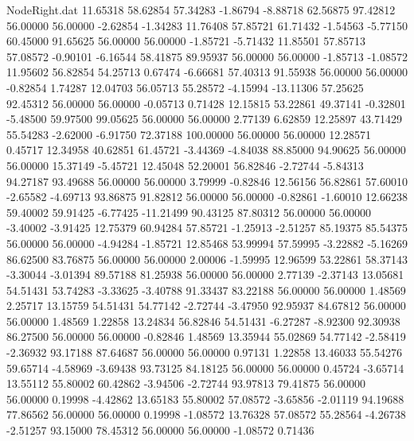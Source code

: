 \begin{filecontents}{NodeRight.dat}
  11.65318   58.62854   57.34283    -1.86794   -8.88718   62.56875   97.42812   56.00000   56.00000   -2.62854   -1.34283
  11.76408   57.85721   61.71432    -1.54563   -5.77150   60.45000   91.65625   56.00000   56.00000   -1.85721   -5.71432
  11.85501   57.85713   57.08572    -0.90101   -6.16544   58.41875   89.95937   56.00000   56.00000   -1.85713   -1.08572
  11.95602   56.82854   54.25713     0.67474   -6.66681   57.40313   91.55938   56.00000   56.00000   -0.82854    1.74287
  12.04703   56.05713   55.28572    -4.15994  -13.11306   57.25625   92.45312   56.00000   56.00000   -0.05713    0.71428
  12.15815   53.22861   49.37141    -0.32801   -5.48500   59.97500   99.05625   56.00000   56.00000    2.77139    6.62859
  12.25897   43.71429   55.54283    -2.62000   -6.91750   72.37188  100.00000   56.00000   56.00000   12.28571    0.45717
  12.34958   40.62851   61.45721    -3.44369   -4.84038   88.85000   94.90625   56.00000   56.00000   15.37149   -5.45721
  12.45048   52.20001   56.82846    -2.72744   -5.84313   94.27187   93.49688   56.00000   56.00000    3.79999   -0.82846
  12.56156   56.82861   57.60010    -2.65582   -4.69713   93.86875   91.82812   56.00000   56.00000   -0.82861   -1.60010
  12.66238   59.40002   59.91425    -6.77425  -11.21499   90.43125   87.80312   56.00000   56.00000   -3.40002   -3.91425
  12.75379   60.94284   57.85721    -1.25913   -2.51257   85.19375   85.54375   56.00000   56.00000   -4.94284   -1.85721
  12.85468   53.99994   57.59995    -3.22882   -5.16269   86.62500   83.76875   56.00000   56.00000    2.00006   -1.59995
  12.96599   53.22861   58.37143    -3.30044   -3.01394   89.57188   81.25938   56.00000   56.00000    2.77139   -2.37143
  13.05681   54.51431   53.74283    -3.33625   -3.40788   91.33437   83.22188   56.00000   56.00000    1.48569    2.25717
  13.15759   54.51431   54.77142    -2.72744   -3.47950   92.95937   84.67812   56.00000   56.00000    1.48569    1.22858
  13.24834   56.82846   54.51431    -6.27287   -8.92300   92.30938   86.27500   56.00000   56.00000   -0.82846    1.48569
  13.35944   55.02869   54.77142    -2.58419   -2.36932   93.17188   87.64687   56.00000   56.00000    0.97131    1.22858
  13.46033   55.54276   59.65714    -4.58969   -3.69438   93.73125   84.18125   56.00000   56.00000    0.45724   -3.65714
  13.55112   55.80002   60.42862    -3.94506   -2.72744   93.97813   79.41875   56.00000   56.00000    0.19998   -4.42862
  13.65183   55.80002   57.08572    -3.65856   -2.01119   94.19688   77.86562   56.00000   56.00000    0.19998   -1.08572
  13.76328   57.08572   55.28564    -4.26738   -2.51257   93.15000   78.45312   56.00000   56.00000   -1.08572    0.71436

\end{filecontents}
